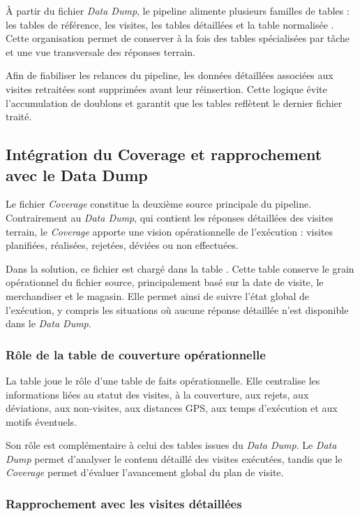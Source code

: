 À partir du fichier \textit{Data Dump}, le pipeline alimente plusieurs familles de tables : les tables de référence, les visites, les tables détaillées  et la table normalisée . Cette organisation permet de conserver à la fois des tables spécialisées par tâche et une vue transversale des réponses terrain.

Afin de fiabiliser les relances du pipeline, les données détaillées associées aux visites retraitées sont supprimées avant leur réinsertion. Cette logique évite l’accumulation de doublons et garantit que les tables reflètent le dernier fichier traité.

\subsection{Intégration du Coverage et rapprochement avec le Data Dump}

Le fichier \textit{Coverage} constitue la deuxième source principale du pipeline. Contrairement au \textit{Data Dump}, qui contient les réponses détaillées des visites terrain, le \textit{Coverage} apporte une vision opérationnelle de l’exécution : visites planifiées, réalisées, rejetées, déviées ou non effectuées.

Dans la solution, ce fichier est chargé dans la table . Cette table conserve le grain opérationnel du fichier source, principalement basé sur la date de visite, le merchandiser et le magasin. Elle permet ainsi de suivre l’état global de l’exécution, y compris les situations où aucune réponse détaillée n’est disponible dans le \textit{Data Dump}.

\subsubsection{Rôle de la table de couverture opérationnelle}

La table  joue le rôle d’une table de faits opérationnelle. Elle centralise les informations liées au statut des visites, à la couverture, aux rejets, aux déviations, aux non-visites, aux distances GPS, aux temps d’exécution et aux motifs éventuels.

Son rôle est complémentaire à celui des tables issues du \textit{Data Dump}. Le \textit{Data Dump} permet d’analyser le contenu détaillé des visites exécutées, tandis que le \textit{Coverage} permet d’évaluer l’avancement global du plan de visite.

\subsubsection{Rapprochement avec les visites détaillées}

